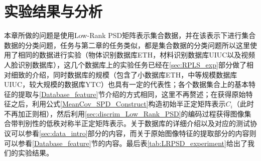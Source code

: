 \section{实验结果与分析}
本章所做的问题是使用Low-Rank PSD矩阵表示集合数据，并在该表示下进行集合数据的分类问题，任务与第二章的任务类似，都是集合数据的分类问题所以这里使用了相同的数据进行实验（物体识别数据库ETH\cite{Database_ETH80}，材料识别数据库UIUC\cite{Database_UIUC}以及视频人脸识别数据库\cite{Database_YTC}），这几个数据库上的实验任务已经在\ref{sec:RPLS_exp}部分做了相对细致的介绍，同时数据库的规模（包含了小数据库ETH，中等规模数据库UIUC，较大规模的数据库YTC）也具有一定的代表性；各个数据集合上的基本特征的提取与\ref{Database_feature}节介绍的方式相同，这里不再赘述；在获得原始特征之后，利用公式\ref{MeanCov_SPD_Construct}构造初始半正定矩阵表示$C_{i}$（此时不再加正则相），然后利用\ref{sec:discrim_Low_Rank_PSD}的编码过程获得图像集合带判别性的低秩对称半正定矩阵表示。关于数据库的详细介绍以及对应的测试协议可以参看\ref{sec:data_intro}部分的内容，而关于原始图像特征的提取部分的内容则可以参看\ref{Database_feature}节的内容。最后表\ref{tab:LRPSD_experiment}给出了我们的实验结果。

